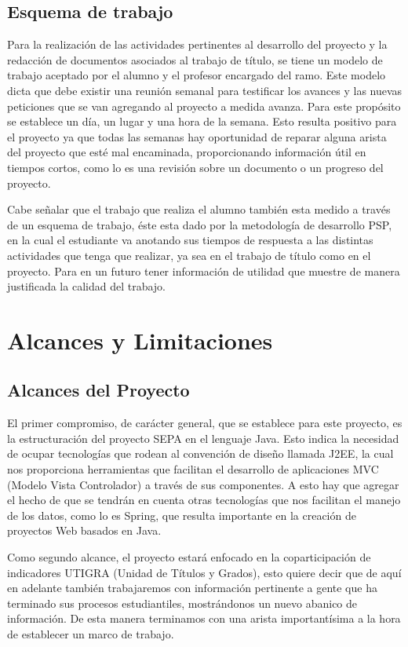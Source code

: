 \documentclass[a4paper,12pt,openany,oneside]{book}
\begin{document}
\section{Esquema de trabajo}
Para la realización de las actividades pertinentes al desarrollo del proyecto y la redacción de documentos asociados al trabajo de título, se tiene un modelo de trabajo aceptado por el alumno y el profesor encargado del ramo. Este modelo dicta que debe existir una reunión semanal para testificar los avances y las nuevas peticiones que se van agregando al proyecto a medida avanza. Para este propósito se establece un día, un lugar y una hora de la semana. Esto resulta positivo para el proyecto ya que todas las semanas hay oportunidad de reparar alguna arista del proyecto que esté mal encaminada, proporcionando información útil en tiempos cortos, como lo es una revisión sobre un documento o un progreso del proyecto.

Cabe señalar que el trabajo que realiza el alumno también esta medido a través de un esquema de trabajo, éste esta dado por la metodología de desarrollo PSP, en la cual el estudiante va anotando sus tiempos de respuesta a las distintas actividades que tenga que realizar, ya sea en el trabajo de título como en el proyecto. Para en un futuro tener información de utilidad que muestre de manera justificada la calidad del trabajo.
\chapter{Alcances y Limitaciones}
\thispagestyle{empty}
\section{Alcances del Proyecto}
El primer compromiso, de carácter general, que se establece para este proyecto, es la estructuración del proyecto SEPA en el lenguaje Java. Esto indica la necesidad de ocupar tecnologías que rodean al convención de diseño llamada J2EE, la cual nos proporciona herramientas que facilitan el desarrollo de aplicaciones MVC (Modelo Vista Controlador) a través de sus componentes. A esto hay que agregar el hecho de que se tendrán en cuenta otras tecnologías que nos facilitan el manejo de los datos, como lo es Spring, que resulta importante en la creación de proyectos Web basados en Java.

Como segundo alcance, el proyecto estará enfocado en la coparticipación de indicadores UTIGRA (Unidad de Títulos y Grados), esto quiere decir que de aquí en adelante también trabajaremos con información pertinente a gente que ha terminado sus procesos estudiantiles, mostrándonos un nuevo abanico de información. De esta manera terminamos con una arista importantísima a la hora de establecer un marco de trabajo.
\end{document}
